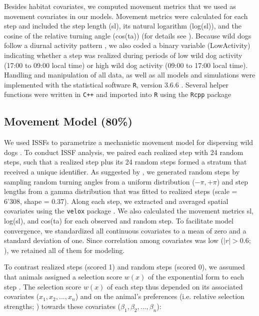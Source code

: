 \documentclass[abstract=on,10pt,a4paper,bibliography=totocnumbered]{article}
\begin{document}
Besides habitat covariates, we computed movement metrics that we used as
movement covariates in our models. Movement metrics were calculated for each
step and included the step length (\textsf{sl}), its natural logarithm
(\textsf{log(sl)}), and the cosine of the relative turning angle
(\textsf{cos(ta)}) (for details see \citep{Avgar.2016, Fieberg.2020}). Because
wild dogs follow a diurnal activity pattern \citep{Castello.2018}, we also coded
a binary variable (\textsf{LowActivity}) indicating whether a step was realized
during periods of low wild dog activity (17:00 to 09:00 local time) or high wild
dog activity (09:00 to 17:00 local time). Handling and manipulation of all data,
as well as all models and simulations were implemented with the statistical
software {\tt R}, version 3.6.6 \citep{R.2019}. Several helper functions were
written in {\tt C++} and imported into {\tt R} using the {\tt Rcpp} package
\citep{Eddelbuettel.2011, Eddelbuettel.2013}

\subsection{Movement Model (80\%)}
We used ISSFs to parametrize a mechanistic movement model for dispersing wild
dogs \citep{Avgar.2016}. To conduct ISSF analysis, we paired each realized step
with 24 random steps, such that a realized step plus its 24 random steps formed
a stratum that received a unique identifier. As suggested by \cite{Avgar.2016},
we generated random steps by sampling random turning angles from a uniform
distribution (\(-\pi, +\pi\)) and step lengths from a gamma distribution that
was fitted to realized steps (scale = 6'308, shape = 0.37). Along each step, we
extracted and averaged spatial covariates using the {\tt velox} package
\citep{Hunziker.2021}. We also calculated the movement metrics \textsf{sl},
\textsf{log(sl)}, and \textsf{cos(ta)} for each observed and random step. To
facilitate model convergence, we standardized all continuous covariates to a
mean of zero and a standard deviation of one. Since correlation among covariates
was low (\(|r| > 0.6\); \citealp{Latham.2011}), we retained all of them for
modeling.

To contrast realized steps (scored 1) and random steps (scored 0), we assumed
that animals assigned a selection score \(w(x)\) of the exponential form to each
step \citep{Fortin.2005}. The selection score \(w(x)\) of each step thus
depended on its associated covariates (\(x_1, x_2, ..., x_n\)) and on the
animal's preferences (i.e. relative selection strengths; \citealp{Avgar.2017})
towards these covariates (\(\beta_1, \beta_2, ..., \beta_n\)):
\end{document}
